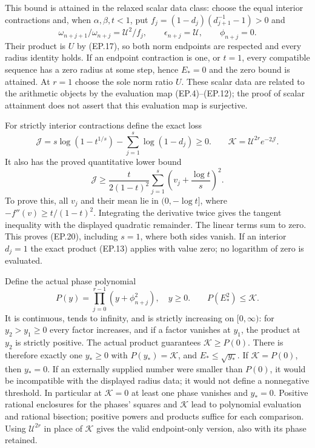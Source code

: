 This bound is attained in the relaxed scalar data class: choose
the equal interior contractions and, when $\alpha,\beta,t<1$, put
$f_j=(1-d_j)(d_{j+1}^{-1}-1)>0$ and
\[
 \omega_{n+j+1}/\omega_{n+j}=\mathcal U^2/f_j,
 \qquad\epsilon_{n+j}=\mathcal U,\qquad\phi_{n+j}=0.
\tag{EP.18}
\]
Their product is $U$ by (EP.17), so both norm endpoints are respected
and every radius identity holds. If an endpoint contraction is one,
or $t=1$, every compatible sequence has a zero radius at some step,
hence $E_*=0$ and the zero bound is attained. At $r=1$ choose the
sole norm ratio $U$. These scalar data are related to the arithmetic
objects by the evaluation map (EP.4)--(EP.12); the proof of scalar
attainment does not assert that this evaluation map is surjective.

For strictly interior contractions define the exact loss
\[
 \mathcal J=s\log(1-t^{1/s})-\sum_{j=1}^s\log(1-d_j)\ge0.
 \qquad \mathcal K=\mathcal U^{2r}e^{-2\mathcal J}.
\tag{EP.19}
\]
It also has the proved quantitative lower bound
\[
 \mathcal J\ge\frac{t}{2(1-t)^2}
 \sum_{j=1}^s\left(v_j+\frac{\log t}{s}\right)^2.
\tag{EP.20}
\]
To prove this, all $v_j$ and their mean lie in $(0,-\log t]$,
where $-f''(v)\ge t/(1-t)^2$. Integrating the derivative twice
gives the tangent inequality with the displayed quadratic remainder.
The linear terms sum to zero. This proves (EP.20), including $s=1$,
where both sides vanish. If an interior $d_j=1$ the exact product
(EP.13) applies with value zero; no logarithm of zero is evaluated.

Define the actual phase polynomial
\[
 P(y)=\prod_{j=0}^{r-1}(y+\phi_{n+j}^2),\quad y\ge0.
 \qquad P(E_*^2)\le\mathcal K.\tag{EP.21}
\]
It is continuous, tends to infinity, and is strictly increasing on
$[0,\infty)$: for $y_2>y_1\ge0$ every factor increases, and if a
factor vanishes at $y_1$, the product at $y_2$ is strictly positive.
The actual product guarantees $\mathcal K\ge P(0)$. There is
therefore exactly one $y_*\ge0$ with $P(y_*)=\mathcal K$, and
$E_*\le\sqrt{y_*}$. If $\mathcal K=P(0)$, then $y_*=0$.
If an externally supplied number were smaller than $P(0)$, it would
be incompatible with the displayed radius data; it would not define
a nonnegative threshold. In particular at $\mathcal K=0$ at least
one phase vanishes and $y_*=0$. Positive rational enclosures for
the phases' squares and $\mathcal K$ lead to polynomial evaluation
and rational bisection; positive powers and products suffice for each
comparison. Using $\mathcal U^{2r}$ in place of $\mathcal K$
gives the valid endpoint-only version, also with its phase retained.

